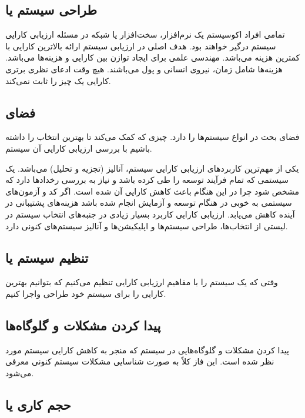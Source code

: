 \subsection{طراحی سیستم یا }

تمامی افراد اکوسیستم یک نرم‌افزار، سخت‌افزار یا شبکه در مسئله ارزیابی کارایی
سیستم درگیر خواهند بود. هدف اصلی در ارزیابی سیستم ارائه بالاترین کارایی با
کمترین هزینه می‌باشد. مهندسی علمی برای ایجاد توازن بین کارایی و هزینه‌ها
می‌باشد. هزینه‌ها شامل زمان، نیروی انسانی و پول می‌باشند. هیچ وقت ادعای نظری
برتری کارایی یک چیز را ثابت نمی‌کند.

\subsection{فضای }

فضای  بحث در انواع سیستم‌ها را دارد. چیزی که کمک می‌کند تا بهترین
انتخاب را داشته باشیم با بررسی ارزیابی کارایی آن سیستم.

یکی از مهم‌ترین کاربرد‌های ارزیابی کارایی سیستم، آنالیز (تجزیه و تحلیل) می‌باشد.
یک سیستمی که تمام فرآیند توسعه را طی کرده باشد و نیاز به بررسی رخداد‌ها دارد که
مشخص شود چرا در این هنگام باعث کاهش کارایی آن شده است. اگر کد و آزمون‌های سیستمی
به خوبی در هنگام توسعه و آزمایش انجام شده باشد هزینه‌های پشتیبانی در آینده کاهش
می‌یابد. ارزیابی کارایی کاربرد بسیار زیادی در جنبه‌های انتخاب سیستم در لیستی از
انتخاب‌ها، طراحی سیستم‌ها و اپلیکیشن‌ها و آنالیز سیستم‌های کنونی دارد.

\subsection{تنظیم سیستم یا }

وقتی که یک سیستم را با مفاهیم ارزیابی کارایی تنظیم می‌کنیم که بتوانیم بهترین
کارایی را برای سیستم خود طراحی واجرا کنیم.

\subsection{پیدا کردن مشکلات و گلوگاه‌ها }

پیدا کردن مشکلات و گلوگاه‌هایی در سیستم که منجر به کاهش کارایی سیستم مورد نظر
شده است. این فاز کلاً به صورت شناسایی مشکلات سیستم کنونی معرفی می‌شود.

\subsection{حجم کاری یا }

